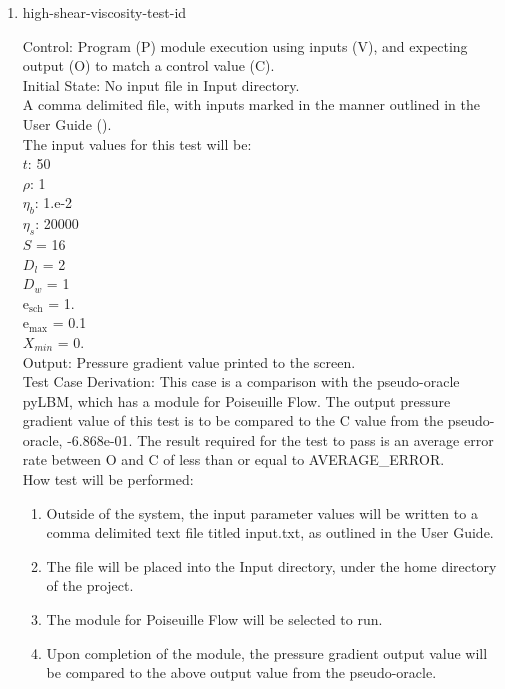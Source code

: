 \documentclass[12pt, titlepage]{article}
\newcounter{testcounter} %
\begin{document}
\begin{enumerate}
\item{high-shear-viscosity-test-id\thetestcounter \\}

Control: Program (P) module execution using inputs (V), and expecting output (O)
to match a control value (C).\\
					
Initial State: No input file in Input directory.\\
					
A comma delimited file, with inputs marked in the manner outlined in the User
Guide (\citet{LBM_UserGuide_PM}).\\The input values for this test will be:\\
$t$: 50\\
$\rho$: 1\\
$\eta_b$: 1.e-2\\
$\eta_s$: 20000\\
$S$ = 16\\
$D_{l}$ = 2\\
$D_{w}$ = 1\\
$\mathrm{e_{sch}}$ = 1.\\
$\mathrm{e_{max}}$ = 0.1\\
$X_{min}$ = 0.\\
					
Output: Pressure gradient value printed to the screen. \\ 

Test Case Derivation: This case is a comparison with the pseudo-oracle pyLBM,
which has a module for Poiseuille Flow. The output pressure gradient value of
this test is to be compared to the C value from the pseudo-oracle,
-6.868e-01. The result required for the test to pass is an average error rate
between O and C of less than or equal to AVERAGE\_ERROR.\\
					
How test will be performed: 

\begin{enumerate}
\item Outside of the system, the input parameter values will be written to a
comma delimited text file titled input.txt, as outlined in the User Guide.
\item The file will be placed into the Input directory, under the home directory
of the project.
\item The module for Poiseuille Flow will be selected to run.
\item Upon completion of the module, the pressure gradient output value will be
compared to the above output value from the pseudo-oracle.
\end{enumerate}	

\end{enumerate}
\end{document}
